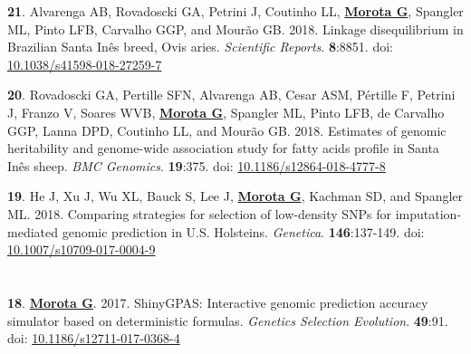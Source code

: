 \documentclass[margin,line,10pt]{res}
\newenvironment{list1}{
  \begin{list}{\ding{113}}{%
      \setlength{\itemsep}{0in}
      \setlength{\parsep}{0in} \setlength{\parskip}{0in}
      \setlength{\topsep}{0in} \setlength{\partopsep}{0in} 
      \setlength{\leftmargin}{0.17in}}}{\end{list}}
\begin{document}
\begin{resume}
\begin{list1}
  \vspace{0.5cm}

\item  [{\bf 21}.] Alvarenga AB, Rovadoscki GA, Petrini J, Coutinho LL, \textbf{\underline{Morota G}}, Spangler ML, Pinto LFB, Carvalho GGP, and Mour{\~a}o GB. 2018. Linkage disequilibrium in Brazilian Santa  In{\^e}s breed, Ovis aries. \emph{Scientific Reports}.  \textbf{8}:8851. doi: \textcolor{blue}{\href{https://doi.org/10.1038/s41598-018-27259-7}{10.1038/s41598-018-27259-7}} 

  \vspace{0.5cm}
  
\item  [{\bf 20}.] Rovadoscki GA, Pertille SFN, Alvarenga AB,  Cesar ASM, P{\'e}rtille F, Petrini J, Franzo V, Soares WVB, \textbf{\underline{Morota G}}, Spangler ML, Pinto LFB, de Carvalho GGP, Lanna DPD, Coutinho LL, and Mour{\~a}o GB. 2018. Estimates of genomic heritability and genome-wide association study for fatty acids profile in Santa In{\^e}s sheep. \emph{BMC Genomics}. \textbf{19}:375. doi: \textcolor{blue}{\href{https://doi.org/10.1186/s12864-018-4777-8}{10.1186/s12864-018-4777-8}} 
    
    \vspace{0.5cm}
  
\item  [{\bf 19}.] He J, Xu J, Wu XL, Bauck S, Lee J, \textbf{\underline{Morota G}}, Kachman SD, and Spangler ML. 2018. Comparing strategies for selection of low-density SNPs for imputation-mediated genomic prediction in U.S. Holsteins. \emph{Genetica}. \textbf{146}:137-149. doi: \textcolor{blue}{\href{https://dx.doi.org/10.1007/s10709-017-0004-9}{10.1007/s10709-017-0004-9}}

\end{list1}


\section{}

\begin{list1}

\item  [{\bf 18}.] \textbf{\underline{Morota G}}. 2017. ShinyGPAS: Interactive genomic prediction accuracy simulator based on deterministic formulas. \emph{Genetics Selection Evolution}. \textbf{49}:91. doi: \textcolor{blue}{\href{https://dx.doi.org/10.1186/s12711-017-0368-4}{10.1186/s12711-017-0368-4}}


\end{list1}
\end{resume}
\end{document}
